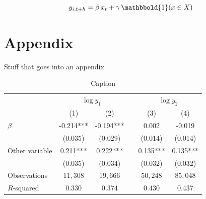 \documentclass[12pt]{article}
\newcommand{\bi}{\mathbbold{1}}
\begin{document}
\lipsum[5-6]

\begin{equation}
    y_{i,t+h} = \beta\, x_t + \gamma \, \bi(x \in X)
\end{equation}






\newpage\clearpage
\appendix 
\setcounter{figure}{0} \renewcommand{\thefigure}{A\arabic{figure}}
\setcounter{table}{0} \renewcommand{\thetable}{A\arabic{table}}

\section*{Appendix}
Stuff that goes into an appendix

\lipsum[7]

\begin{table}[h]
    \centering
    \begin{tabular}{lSScSS}
    &  && 
       \\
            & {(1)}     & {(2)}     && {(3)}     & {(4)}     \\ \midrule
    $\beta$
            & -0.214*** & -0.194*** &&  0.002    & -0.019    \\
            & (0.035)   & (0.029)   && (0.014)   & (0.014)   \\
    Other variable
            &  0.211*** &  0.222*** &&  0.135*** &  0.135*** \\
            & (0.035)   & (0.034)   && (0.032)   & (0.032)   \\ \midrule
    Observations 
            &  {$11{,}308$} & {$19{,}666$}  && {$50{,}248$}  & {$85{,}048$}  \\
    $R$-squared
            & {$0.330$}   & {$0.374$}   && {$0.430$}   & {$0.437$}   \\ \bottomrule
    \end{tabular}
    \caption{Caption}
    \label{tab:my_label}
\end{table}
\end{document}

